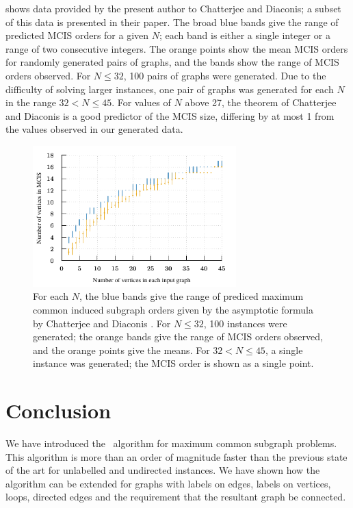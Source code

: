 shows data provided by the present author to Chatterjee and Diaconis; a subset
of this data is presented in their paper.  The broad blue bands give the
range of predicted MCIS orders for a given $N$; each band is either a single
integer or a range of two consecutive integers.  The orange points show the mean
MCIS orders for randomly generated pairs of graphs, and the bands show the
range of MCIS orders observed.  For $N \leq 32$, 100 pairs of graphs were
generated.  Due to the difficulty of solving larger instances, one pair
of graphs was generated for each $N$ in the range $32 < N \leq 45$.  For values
of $N$ above 27, the theorem of Chatterjee and Diaconis is a good predictor
of the MCIS size, differing by at most 1 from the values observed in our
generated data.

\begin{figure}[h!]
    \centering
    \includegraphics*[width=0.7\textwidth]{14-mcsplit-i-undirected/data-for-diaconis-and-chatterjee/plot}
    \caption{For each $N$, the blue bands give the range of prediced maximum
    common induced subgraph orders given by the asymptotic formula by
    Chatterjee and Diaconis \cite{chatterjee2021isomorphisms}.  For $N \leq 32$,
    100 instances were generated; the orange bands give the range of MCIS orders
    observed, and the orange points give the means.  For $32 < N \leq 45$,
    a single instance was generated; the MCIS order is shown as a single point.}
    \label{figure:mcis-order-bands}
\end{figure}

\section{Conclusion}

We have introduced the \McSplit\ algorithm for maximum common subgraph
problems.  This algorithm is more than an order of magnitude faster than the
previous state of the art for unlabelled and undirected instances. We have
shown how the algorithm can be extended for graphs with labels on edges, labels
on vertices, loops, directed edges and the requirement that the resultant graph
be connected.

